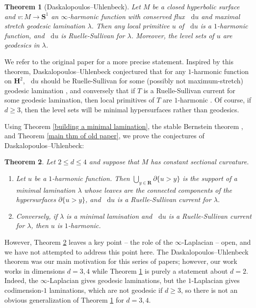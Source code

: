 \documentclass[reqno,11pt]{amsart}
\newcommand{\RR}{\mathbf{R}}
\newcommand{\Hyp}{\mathbf H}
\newcommand{\Sph}{\mathbf S}
\newcommand*\dif{\mathop{}\!\mathrm{d}}
\newtheorem{theorem}{Theorem}[section]
\theoremstyle{definition}
\numberwithin{equation}{section}
\begin{document}
\begin{theorem}[Daskalopoulos--Uhlenbeck]\label{DU theorem}
Let $M$ be a closed hyperbolic surface and $v: M \to \Sph^1$ an $\infty$-harmonic function with conserved flux $\dif u$ and maximal stretch geodesic lamination $\lambda$.
Then any local primitive $u$ of $\dif u$ is a $1$-harmonic function, and $\dif u$ is Ruelle-Sullivan for $\lambda$.
Moreover, the level sets of $u$ are geodesics in $\lambda$.
\end{theorem}

We refer to the original paper \cite{daskalopoulos2020transverse} for a more precise statement.
Inspired by this theorem, Daskalopoulos--Uhlenbeck conjectured that for any $1$-harmonic function on $\Hyp^2$, $\dif u$ should be Ruelle-Sullivan for some (possibly not maximum-stretch) geodesic lamination \cite[Problem 9.4]{daskalopoulos2020transverse}, and conversely that if $T$ is a Ruelle-Sullivan current for some geodesic lamination, then local primitives of $T$ are $1$-harmonic \cite[Conjecture 9.5]{daskalopoulos2020transverse}.
Of course, if $d \geq 3$, then the level sets will be minimal hypersurfaces rather than geodesics.

Using Theorem \ref{building a minimal lamination}, the stable Bernstein theorem \cite{Schoen2016, Chodosh2021}, and Theorem \ref{main thm of old paper}, we prove the conjectures of Daskalopoulos--Uhlenbeck:

\begin{theorem}\label{main thm}
Let $2 \leq d \leq 4$ and suppose that $M$ has constant sectional curvature.
\begin{enumerate}
\item Let $u$ be a $1$-harmonic function.
Then $\bigcup_{y \in \RR} \partial \{u > y\}$ is the support of a minimal lamination $\lambda$ whose leaves are the connected components of the hypersurfaces $\partial \{u > y\}$, and $\dif u$ is a Ruelle-Sullivan current for $\lambda$.
\item Conversely, if $\lambda$ is a minimal lamination and $\dif u$ is a Ruelle-Sullivan current for $\lambda$, then $u$ is $1$-harmonic.
\end{enumerate}
\end{theorem}

However, Theorem \ref{main thm} leaves a key point -- the role of the $\infty$-Laplacian -- open, and we have not attempted to address this point here.
The Daskalopoulos--Uhlenbeck theorem was our main motivation for this series of papers; however, our work works in dimensions $d = 3, 4$ while Theorem \ref{DU theorem} is purely a statement about $d = 2$.
Indeed, the $\infty$-Laplacian gives geodesic laminations, but the $1$-Laplacian gives codimension-$1$ laminations, which are not geodesic if $d \geq 3$, so there is not an obvious generalization of Theorem \ref{DU theorem} for $d = 3, 4$.
\end{document}
